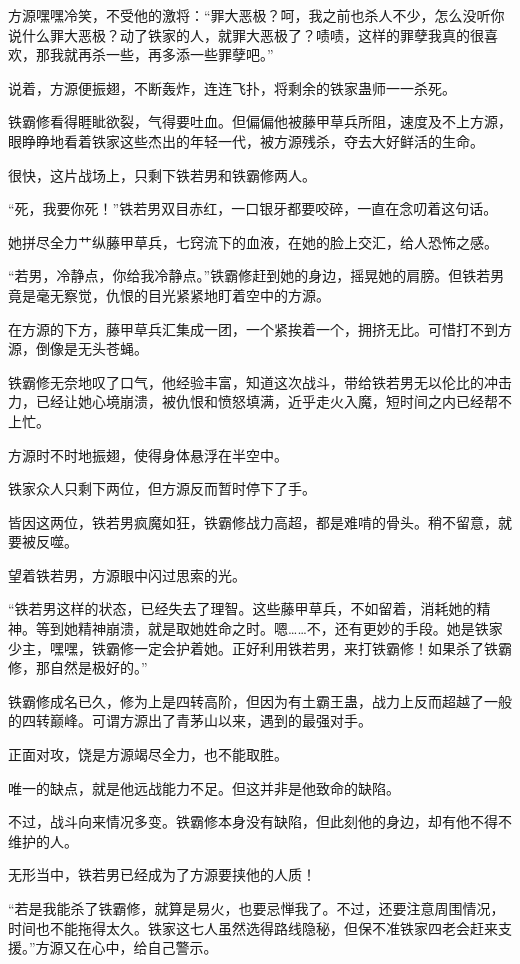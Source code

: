 \begin{this_body}
方源嘿嘿冷笑，不受他的激将：“罪大恶极？呵，我之前也杀人不少，怎么没听你说什么罪大恶极？动了铁家的人，就罪大恶极了？啧啧，这样的罪孽我真的很喜欢，那我就再杀一些，再多添一些罪孽吧。”

说着，方源便振翅，不断轰炸，连连飞扑，将剩余的铁家蛊师一一杀死。

铁霸修看得睚眦欲裂，气得要吐血。但偏偏他被藤甲草兵所阻，速度及不上方源，眼睁睁地看着铁家这些杰出的年轻一代，被方源残杀，夺去大好鲜活的生命。

很快，这片战场上，只剩下铁若男和铁霸修两人。

“死，我要你死！”铁若男双目赤红，一口银牙都要咬碎，一直在念叨着这句话。

她拼尽全力艹纵藤甲草兵，七窍流下的血液，在她的脸上交汇，给人恐怖之感。

“若男，冷静点，你给我冷静点。”铁霸修赶到她的身边，摇晃她的肩膀。但铁若男竟是毫无察觉，仇恨的目光紧紧地盯着空中的方源。

在方源的下方，藤甲草兵汇集成一团，一个紧挨着一个，拥挤无比。可惜打不到方源，倒像是无头苍蝇。

铁霸修无奈地叹了口气，他经验丰富，知道这次战斗，带给铁若男无以伦比的冲击力，已经让她心境崩溃，被仇恨和愤怒填满，近乎走火入魔，短时间之内已经帮不上忙。

方源时不时地振翅，使得身体悬浮在半空中。

铁家众人只剩下两位，但方源反而暂时停下了手。

皆因这两位，铁若男疯魔如狂，铁霸修战力高超，都是难啃的骨头。稍不留意，就要被反噬。

望着铁若男，方源眼中闪过思索的光。

“铁若男这样的状态，已经失去了理智。这些藤甲草兵，不如留着，消耗她的精神。等到她精神崩溃，就是取她姓命之时。嗯……不，还有更妙的手段。她是铁家少主，嘿嘿，铁霸修一定会护着她。正好利用铁若男，来打铁霸修！如果杀了铁霸修，那自然是极好的。”

铁霸修成名已久，修为上是四转高阶，但因为有土霸王蛊，战力上反而超越了一般的四转巅峰。可谓方源出了青茅山以来，遇到的最强对手。

正面对攻，饶是方源竭尽全力，也不能取胜。

唯一的缺点，就是他远战能力不足。但这并非是他致命的缺陷。

不过，战斗向来情况多变。铁霸修本身没有缺陷，但此刻他的身边，却有他不得不维护的人。

无形当中，铁若男已经成为了方源要挟他的人质！

“若是我能杀了铁霸修，就算是易火，也要忌惮我了。不过，还要注意周围情况，时间也不能拖得太久。铁家这七人虽然选得路线隐秘，但保不准铁家四老会赶来支援。”方源又在心中，给自己警示。


\end{this_body}
